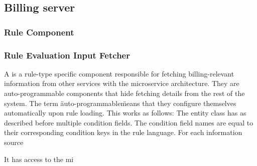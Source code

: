 \subsection{Billing server}




\subsubsection{Rule Component}

\subsubsection{Rule Evaluation Input Fetcher}
A  is a rule-type specific component responsible for fetching billing-relevant information from other services with the \AV microservice architecture.
They are auto-programmable components that hide fetching details from the rest of the system.
The term \"auto-programmable\" means that they configure themselves automatically upon rule loading.
This works as follows: The  entity class has as described before multiple condition fields.
The condition field names are equal to their corresponding condition keys in the rule language.
For each information source 



It has access to the mi



